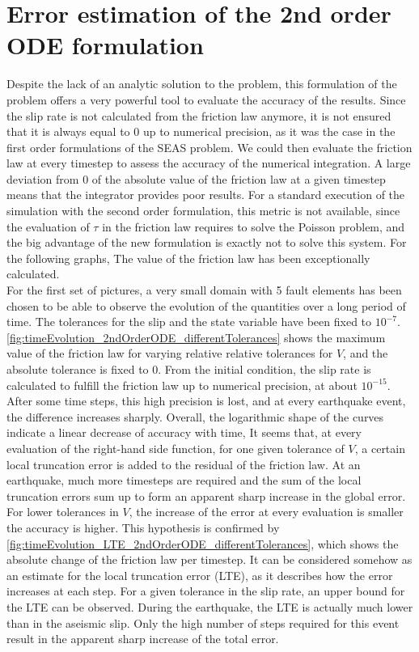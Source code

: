 \section{Error estimation of the 2nd order ODE formulation}
Despite the lack of an analytic solution to the problem, this formulation of the problem offers a very powerful tool to evaluate the accuracy of the results. Since the slip rate is not calculated from the friction law anymore, it is not ensured that it is always equal to 0 up to numerical precision, as it was the case in the first order formulations of the SEAS problem. We could then evaluate the friction law at every timestep to assess the accuracy of the numerical integration. A large deviation from 0 of the absolute value of the friction law at a given timestep means that the integrator provides poor results. For a standard execution of the simulation with the second order formulation, this metric is not available, since the evaluation of $\tau$ in the friction law requires to solve the Poisson problem, and the big advantage of the new formulation is exactly not to solve this system. For the following graphs, The value of the friction law has been exceptionally calculated. \\

For the first set of pictures, a very small domain with 5 fault elements has been chosen to be able to observe the evolution of the quantities over a long period of time. The tolerances for the slip and the state variable have been fixed to $10^{-7}$. \autoref{fig:timeEvolution_2ndOrderODE_differentTolerances} shows the maximum value of the friction law for varying relative relative tolerances for $V$, and the absolute tolerance is fixed to 0. From the initial condition, the slip rate is calculated to fulfill the friction law up to numerical precision, at about $10^{-15}$. After some time steps, this high precision is lost, and at every earthquake event, the difference increases sharply. Overall, the logarithmic shape of the curves indicate a linear decrease of accuracy with time, It seems that, at every evaluation of the right-hand side function, for one given tolerance of $V$, a certain local truncation error is added to the residual of the friction law. At an earthquake, much more timesteps are required and the sum of the local truncation errors sum up to form an apparent sharp increase in the global error. For lower tolerances in $V$, the increase of the error at every evaluation is smaller the accuracy is higher. This hypothesis is confirmed by \autoref{fig:timeEvolution_LTE_2ndOrderODE_differentTolerances}, which shows the absolute change of the friction law per timestep. It can be considered somehow as an estimate for the local truncation error (LTE), as it describes how the error increases at each step. For a given tolerance in the slip rate, an upper bound for the LTE can be observed. During the earthquake, the LTE is actually much lower than in the aseismic slip. Only the high number of steps required for this event result in the apparent sharp increase of the total error. 

